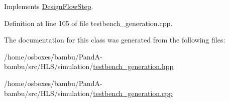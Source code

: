 Implements \hyperlink{classDesignFlowStep_a1783abe0c1d162a52da1e413d5d1ef05}{Design\+Flow\+Step}.



Definition at line 105 of file testbench\+\_\+generation.\+cpp.



The documentation for this class was generated from the following files\+:\begin{DoxyCompactItemize}
\item 
/home/osboxes/bambu/\+Pand\+A-\/bambu/src/\+H\+L\+S/simulation/\hyperlink{testbench__generation_8hpp}{testbench\+\_\+generation.\+hpp}\item 
/home/osboxes/bambu/\+Pand\+A-\/bambu/src/\+H\+L\+S/simulation/\hyperlink{testbench__generation_8cpp}{testbench\+\_\+generation.\+cpp}\end{DoxyCompactItemize}
